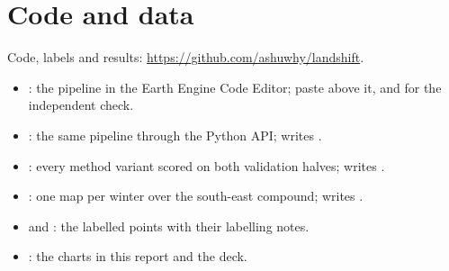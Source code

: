 \documentclass[11pt,a4paper]{article}
\begin{document}
\section{Code and data}
\label{sec:code}
Code, labels and results: \url{https://github.com/ashuwhy/landshift}.
\begin{itemize}
  \item {}: the pipeline in the Earth Engine Code Editor; paste  above it, and  for the independent check.
  \item {}: the same pipeline through the Python API; writes .
  \item {}: every method variant scored on both validation halves; writes .
  \item {}: one map per winter over the south-east compound; writes .
  \item {} and : the labelled points with their labelling notes.
  \item {}: the charts in this report and the deck.
\end{itemize}

\end{document}
